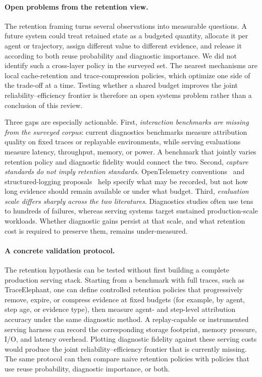 \paragraph*{Open problems from the retention view.}
The retention framing turns several observations into measurable questions. A future system could treat retained state as a budgeted quantity, allocate it per agent or trajectory, assign different value to different evidence, and release it according to both reuse probability and diagnostic importance. We did not identify such a cross-layer policy in the surveyed set. The nearest mechanisms are local cache-retention and trace-compression policies, which optimize one side of the trade-off at a time. Testing whether a shared budget improves the joint reliability--efficiency frontier is therefore an open systems problem rather than a conclusion of this review.

Three gaps are especially actionable. First, \emph{interaction benchmarks are missing from the surveyed corpus}: current diagnostics benchmarks measure attribution quality on fixed traces or replayable environments, while serving evaluations measure latency, throughput, memory, or power. A benchmark that jointly varies retention policy and diagnostic fidelity would connect the two. Second, \emph{capture standards do not imply retention standards}. OpenTelemetry conventions~\cite{opentelemetry2026} and structured-logging proposals~\cite{agenttrace2026} help specify what may be recorded, but not how long evidence should remain available or under what budget. Third, \emph{evaluation scale differs sharply across the two literatures}. Diagnostics studies often use tens to hundreds of failures, whereas serving systems target sustained production-scale workloads. Whether diagnostic gains persist at that scale, and what retention cost is required to preserve them, remains under-measured.

\paragraph*{A concrete validation protocol.}
The retention hypothesis can be tested without first building a complete production serving stack. Starting from a benchmark with full traces, such as TraceElephant, one can define controlled retention policies that progressively remove, expire, or compress evidence at fixed budgets (for example, by agent, step age, or evidence type), then measure agent- and step-level attribution accuracy under the same diagnostic method. A replay-capable or instrumented serving harness can record the corresponding storage footprint, memory pressure, I/O, and latency overhead. Plotting diagnostic fidelity against these serving costs would produce the joint reliability--efficiency frontier that is currently missing. The same protocol can then compare naive retention policies with policies that use reuse probability, diagnostic importance, or both.

